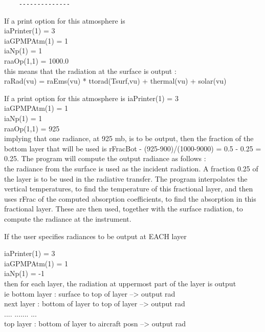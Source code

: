 \documentclass[12pt]{article}
\newcommand{\ttab}{\indent\indent}
\begin{document}
{{\begin{verbatim}
    --------------
\end{verbatim}
If a print option for this atmosphere is \\
\medskip
\ttab iaPrinter(1) = 3\\
\ttab iaGPMPAtm(1) = 1\\
\ttab iaNp(1)      = 1\\
\ttab raaOp(1,1)   = 1000.0\\
this means that the radiation at the surface is output : \\
raRad(vu) = raEms(vu) * ttorad(Tsurf,vu) + thermal(vu) + solar(vu)

If a print option for this atmosphere is
\medskip
\ttab iaPrinter(1) = 3\\
\ttab iaGPMPAtm(1) = 1\\
\ttab iaNp(1)      = 1\\
\ttab raaOp(1,1)   = 925\\

implying that one radiance, at 925 mb, is to be output, then the fraction of 
the bottom layer that will be used is rFracBot - (925-900)/(1000-9000) = 
0.5 - 0.25 = 0.25. The program will compute the output radiance as follows : \\
the radiance from the surface is used as the incident radiation. A 
fraction 0.25 of the layer is to be used in the radiative transfer.
The program interpolates the vertical temperatures, to find the temperature
of this fractional layer, and then uses rFrac of the computed absorption
coefficients, to find the absorption in this fractional layer. These
are then used, together with the surface radiation, to compute the radiance at 
the instrument. 


If the user specifies radiances to be output at EACH layer \\
\medskip

\ttab iaPrinter(1) = 3\\
\ttab iaGPMPAtm(1) = 1\\
\ttab iaNp(1)      = -1\\

then for each layer, the radiation at uppermost part of the layer is output\\
ie bottom layer : surface to top of layer           --> output rad\\
     next layer : bottom of layer to top of layer   --> output rad \\
       ....          .......                      ...\\
      top layer : bottom of layer to aircraft posn  --> output rad \\

}}
\end{document}
